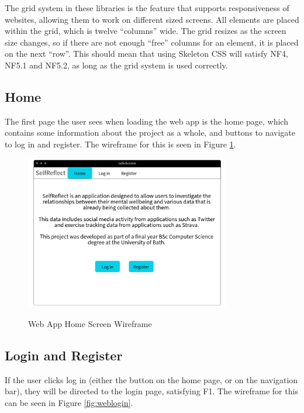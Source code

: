 \documentclass[11pt,openright,a4paper]{report}
\begin{document}
The grid system in these libraries is the feature that supports responsiveness of websites, allowing them to work on different sized screens. All elements are placed within the grid, which is twelve \enquote{columns} wide. The grid resizes as the screen size changes, so if there are not enough \enquote{free} columns for an element, it is placed on the next \enquote{row}. This should mean that using Skeleton CSS will satisfy NF4, NF5.1 and NF5.2, as long as the grid system is used correctly.

\subsection{Home}
The first page the user sees when loading the web app is the home page, which contains some information about the project as a whole, and buttons to navigate to log in and register. The wireframe for this is seen in Figure \ref{fig:webhome}.

\begin{figure}[ht]
\centering
\caption{Web App Home Screen Wireframe}
\includegraphics[width=0.8\textwidth]{i/webhome.png}
\label{fig:webhome}
\end{figure}

\newpage
\subsection{Login and Register}
If the user clicks log in (either the button on the home page, or on the navigation bar), they will be directed to the login page, satisfying F1. The wireframe for this can be seen in Figure \ref{fig:weblogin}.
\end{document}
